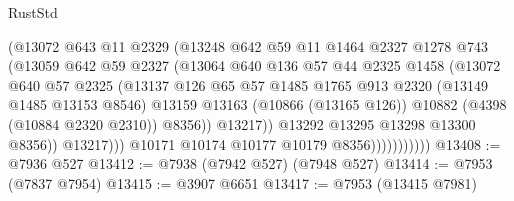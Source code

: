 \begin{lexlean}{RustStd}
\begin{coremodule}
                                (@13072
                                  @643
                                  @11
                                  @2329
                                  (@13248
                                    @642
                                    @59
                                    @11
                                    @1464
                                    @2327
                                    @1278
                                    @743
                                    (@13059
                                      @642
                                      @59
                                      @2327
                                      (@13064
                                        @640
                                        @136
                                        @57
                                        @44
                                        @2325
                                        @1458
                                        (@13072
                                          @640
                                          @57
                                          @2325
                                          (@13137
                                            @126
                                            @65
                                            @57
                                            @1485
                                            @1765
                                            @913
                                            @2320
                                            (@13149 @1485 @13153 @8546)
                                            @13159
                                            @13163
                                            (@10866 (@13165 @126))
                                            @10882
                                            (@4398 (@10884 @2320 @2310))
                                            @8356))
                                        @13217))
                                    @13292
                                    @13295
                                    @13298
                                    @13300
                                    @8356))
                                @13217)))
                          @10171
                          @10174
                          @10177
                          @10179
                          @8356)))))))))))
@13408 := @7936 @527
@13412 := @7938 (@7942 @527) (@7948 @527)
@13414 := @7953 (@7837 @7954)
@13415 := @3907 @6651
@13417 := @7953 (@13415 @7981)

\end{coremodule}
\end{lexlean}
